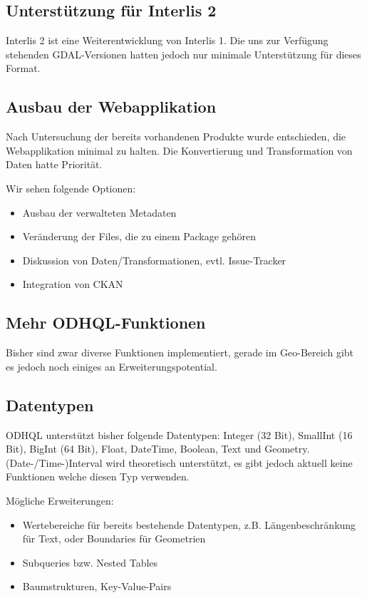 \subsection{Unterstützung für Interlis 2}
Interlis 2 ist eine Weiterentwicklung von Interlis 1. Die uns zur Verfügung stehenden GDAL-Versionen hatten jedoch nur minimale Unterstützung für dieses Format.

\subsection{Ausbau der Webapplikation}
Nach Untersuchung der bereits vorhandenen Produkte wurde entschieden, die Webapplikation minimal zu halten. Die Konvertierung und Transformation von Daten hatte Priorität.

Wir sehen folgende Optionen:
\begin{itemize}
\item Ausbau der verwalteten Metadaten
\item Veränderung der Files, die zu einem Package gehören
\item Diskussion von Daten/Transformationen, evtl. Issue-Tracker
\item Integration von CKAN
\end{itemize}

\subsection{Mehr ODHQL-Funktionen}
Bisher sind zwar diverse Funktionen implementiert, gerade im Geo-Bereich gibt es jedoch noch einiges an Erweiterungspotential.

\subsection{Datentypen}
ODHQL unterstützt bisher folgende Datentypen: Integer (32 Bit), SmallInt (16 Bit), BigInt (64 Bit), Float, DateTime, Boolean, Text und Geometry. (Date-/Time-)Interval wird theoretisch unterstützt, es gibt jedoch aktuell keine Funktionen welche diesen Typ verwenden.

Mögliche Erweiterungen:
\begin{itemize}
\item Wertebereiche für bereits bestehende Datentypen, z.B. Längenbeschränkung für Text, oder Boundaries für Geometrien
\item Subqueries bzw. Nested Tables
\item Baumstrukturen, Key-Value-Pairs
\end{itemize}

